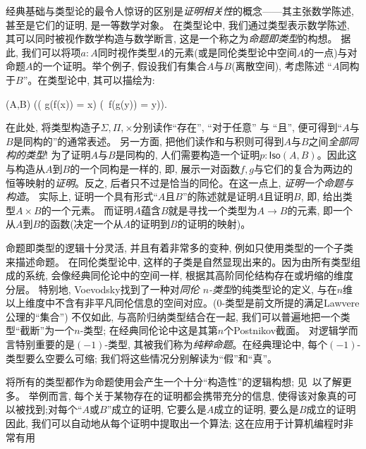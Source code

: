 经典基础与类型论的最令人惊讶的区别是\emph{证明相关性}的概念——其主张数学陈述, 甚至是它们的证明, 是一等数学对象。
在类型论中, 我们通过类型表示数学陈述, 其可以同时被视作数学构造与数学断言, 这是一个称之为\emph{命题即类型}的构想。
%
据此, 我们可以将项$a : A$同时视作类型$A$的元素(或是同伦类型论中空间$A$的一点)与对命题$A$的一个证明。举个例子, 假设我们有集合$A$与$B$(离散空间), 
%
考虑陈述 ``$A$同构于$B$''。在类型论中, 其可以描绘为:
\begin{narrowmultline*}
  (A,B)  \narrowbreak
  \Big(\big( g(f(x)) = x\big) \times \big(\, f(g(y)) = y\big)\Big).
\end{narrowmultline*}
%
在此处, 将类型构造子$\Sigma, \Pi, \times$分别读作``存在'', ``对于任意'' 与 ``且'', 便可得到``$A$与$B$是同构的''的通常表述。
另一方面, 把他们读作和与积则可得到$A$与$B$之间\emph{全部同构的类型}! 为了证明$A$与$B$是同构的, 人们需要构造一个证明$p : \mathsf{Iso}(A,B)$。因此这与构造从$A$到$B$的一个同构是一样的, 即,
展示一对函数$f,g$与它们的复合为两边的恒等映射的\emph{证明}。反之, 后者只不过是恰当的同伦。在这一点上, \emph{证明一个命题与构造}。
实际上, 证明一个具有形式``$A$且$B$''的陈述就是证明$A$且证明$B$, 即, 给出类型$A \times B$的一个元素。
而证明$A$蕴含$B$就是寻找一个类型为$A \to B$的元素, 即一个从$A$到$B$的函数(决定一个从$A$的证明到$B$的证明的映射)。

命题即类型的逻辑十分灵活, 并且有着非常多的变种, 例如只使用类型的一个子类来描述命题。
在同伦类型论中, 这样的子类是自然显现出来的。因为由所有类型组成的系统, 会像经典同伦论中的空间一样, 根据其高阶同伦结构存在或坍缩的维度分层。
特别地, Voevodsky找到了一种对\emph{同伦 $n$-类型}的纯类型论的定义, 与在$n$维以上维度中不含有非平凡同伦信息的空间对应。($0$-类型是前文所提的满足Lawvere公理的``集合'')
不仅如此, 与高阶归纳类型结合在一起, 我们可以普遍地把一个类型``截断''为一个$n$-类型; 在经典同伦论中这是其第$n$个Postnikov截面。
对逻辑学而言特别重要的是$(-1)$-类型, 其被我们称为\emph{纯粹命题}。在经典理论中, 每个$(-1)$-类型要么空要么可缩; 我们将这些情况分别解读为``假''和``真''。

将所有的类型都作为命题使用会产生一个十分``构造性''的逻辑构想; 见~\cite{kolmogorov,TroelstraI,TroelstraII}以了解更多。
举例而言, 每个关于某物存在的证明都会携带充分的信息, 使得该对象真的可以被找到;对每个``$A$或$B$''成立的证明, 它要么是$A$成立的证明, 要么是$B$成立的证明
因此, 我们可以自动地从每个证明中提取出一个算法;   这在应用于计算机编程时非常有用

